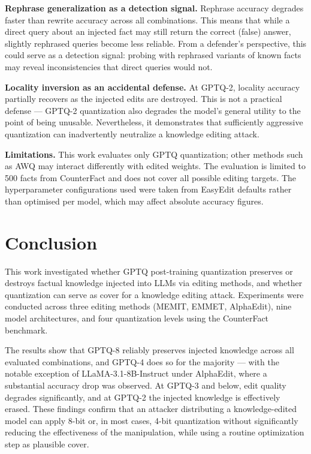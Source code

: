 \documentclass[conference]{IEEEtran}
\begin{document}
\textbf{Rephrase generalization as a detection signal.}
Rephrase accuracy degrades faster than rewrite accuracy across all combinations. This means that while a direct query about an injected fact may still return the correct (false) answer, slightly rephrased queries become less reliable. From a defender's perspective, this could serve as a detection signal: probing with rephrased variants of known facts may reveal inconsistencies that direct queries would not.

\textbf{Locality inversion as an accidental defense.}
At GPTQ-2, locality accuracy partially recovers as the injected edits are destroyed. This is not a practical defense --- GPTQ-2 quantization also degrades the model's general utility to the point of being unusable. Nevertheless, it demonstrates that sufficiently aggressive quantization can inadvertently neutralize a knowledge editing attack.

\textbf{Limitations.}
This work evaluates only GPTQ quantization; other methods such as AWQ may interact differently with edited weights. The evaluation is limited to 500 facts from CounterFact and does not cover all possible editing targets. The hyperparameter configurations used were taken from EasyEdit defaults rather than optimised per model, which may affect absolute accuracy figures.

\section{Conclusion}

This work investigated whether GPTQ post-training quantization preserves or destroys factual knowledge injected into LLMs via editing methods, and whether quantization can serve as cover for a knowledge editing attack. Experiments were conducted across three editing methods (MEMIT, EMMET, AlphaEdit), nine model architectures, and four quantization levels using the CounterFact benchmark.

The results show that GPTQ-8 reliably preserves injected knowledge across all evaluated combinations, and GPTQ-4 does so for the majority --- with the notable exception of LLaMA-3.1-8B-Instruct under AlphaEdit, where a substantial accuracy drop was observed. At GPTQ-3 and below, edit quality degrades significantly, and at GPTQ-2 the injected knowledge is effectively erased. These findings confirm that an attacker distributing a knowledge-edited model can apply 8-bit or, in most cases, 4-bit quantization without significantly reducing the effectiveness of the manipulation, while using a routine optimization step as plausible cover.
\end{document}
